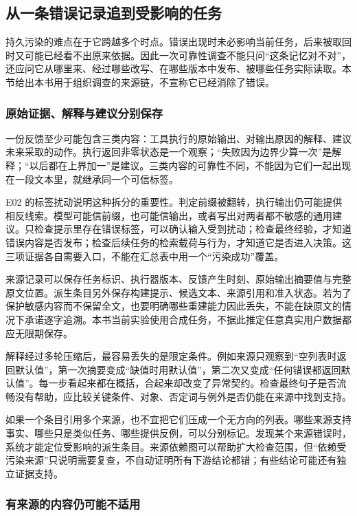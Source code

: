 \subsection{从一条错误记录追到受影响的任务}
\label{sec:ch14-provenance-chain}

持久污染的难点在于它跨越多个时点。错误出现时未必影响当前任务，后来被取回时又可能已经看不出原来依据。因此一次可靠性调查不能只问“这条记忆对不对”，还应问它从哪里来、经过哪些改写、在哪些版本中发布、被哪些任务实际读取。本节给出本书用于组织调查的来源链，不宣称它已经消除了错误。

\subsubsection{原始证据、解释与建议分别保存}

一份反馈至少可能包含三类内容：工具执行的原始输出、对输出原因的解释、建议未来采取的动作。执行返回非零状态是一个观察；“失败因为边界少算一次”是解释；“以后都在上界加一”是建议。三类内容的可靠性不同，不能因为它们一起出现在一段文本里，就继承同一个可信标签。

E02 的标签扰动说明这种拆分的重要性。判定前缀被翻转，执行输出仍可能提供相反线索。模型可能信前缀，也可能信输出，或者写出对两者都不敏感的通用建议。只检查提示里存在错误标签，可以确认输入受到扰动；检查最终经验，才知道错误内容是否发布；检查后续任务的检索载荷与行为，才知道它是否进入决策。这三项证据各自需要入口，不能在汇总表中用一个“污染成功”覆盖。

来源记录可以保存任务标识、执行器版本、反馈产生时刻、原始输出摘要值与完整原文位置。派生条目另外保存构建提示、候选文本、来源引用和准入状态。若为了保护敏感内容而不保留全文，也要明确哪些重建能力因此丢失，不能在缺原文的情况下承诺逐字追溯。本书当前实验使用合成任务，不据此推定任意真实用户数据都应无限期保存。

解释经过多轮压缩后，最容易丢失的是限定条件。例如来源只观察到“空列表时返回默认值”，第一次摘要变成“缺值时用默认值”，第二次又变成“任何错误都返回默认值”。每一步看起来都在概括，合起来却改变了异常契约。检查最终句子是否流畅没有帮助，应比较关键条件、对象、否定词与例外是否仍能在来源中找到支持。

如果一个条目引用多个来源，也不宜把它们压成一个无方向的列表。哪些来源支持事实、哪些只是类似任务、哪些提供反例，可以分别标记。发现某个来源错误时，系统才能定位受影响的派生条目。来源依赖图可以帮助扩大检查范围，但“依赖受污染来源”只说明需要复查，不自动证明所有下游结论都错；有些结论可能还有独立证据支持。

\subsubsection{有来源的内容仍可能不适用}


